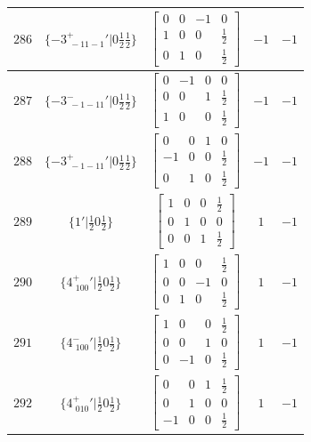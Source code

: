 \documentclass[fleqn,8pt]{jsarticle}
\begin{document}
\begin{longtable}{ccccc}
$ 286 $ & $ \{-3^{+}_{\,\,-11-1}{}'|0 \frac{1}{2} \frac{1}{2}\} $ & $ \begin{bmatrix} 0 & 0 & -1 & 0 \\ 1 & 0 & 0 & \frac{1}{2} \\ 0 & 1 & 0 & \frac{1}{2} \end{bmatrix} $ & $ -1 $ & $ -1 $ \\ \hline
$ 287 $ & $ \{-3^{-}_{\,\,-1-11}{}'|0 \frac{1}{2} \frac{1}{2}\} $ & $ \begin{bmatrix} 0 & -1 & 0 & 0 \\ 0 & 0 & 1 & \frac{1}{2} \\ 1 & 0 & 0 & \frac{1}{2} \end{bmatrix} $ & $ -1 $ & $ -1 $ \\ \hline
$ 288 $ & $ \{-3^{+}_{\,\,-1-11}{}'|0 \frac{1}{2} \frac{1}{2}\} $ & $ \begin{bmatrix} 0 & 0 & 1 & 0 \\ -1 & 0 & 0 & \frac{1}{2} \\ 0 & 1 & 0 & \frac{1}{2} \end{bmatrix} $ & $ -1 $ & $ -1 $ \\ \hline
$ 289 $ & $ \{1{}'|\frac{1}{2} 0 \frac{1}{2}\} $ & $ \begin{bmatrix} 1 & 0 & 0 & \frac{1}{2} \\ 0 & 1 & 0 & 0 \\ 0 & 0 & 1 & \frac{1}{2} \end{bmatrix} $ & $ 1 $ & $ -1 $ \\ \hline
$ 290 $ & $ \{4^{+}_{\,\,100}{}'|\frac{1}{2} 0 \frac{1}{2}\} $ & $ \begin{bmatrix} 1 & 0 & 0 & \frac{1}{2} \\ 0 & 0 & -1 & 0 \\ 0 & 1 & 0 & \frac{1}{2} \end{bmatrix} $ & $ 1 $ & $ -1 $ \\ \hline
$ 291 $ & $ \{4^{-}_{\,\,100}{}'|\frac{1}{2} 0 \frac{1}{2}\} $ & $ \begin{bmatrix} 1 & 0 & 0 & \frac{1}{2} \\ 0 & 0 & 1 & 0 \\ 0 & -1 & 0 & \frac{1}{2} \end{bmatrix} $ & $ 1 $ & $ -1 $ \\ \hline
$ 292 $ & $ \{4^{+}_{\,\,010}{}'|\frac{1}{2} 0 \frac{1}{2}\} $ & $ \begin{bmatrix} 0 & 0 & 1 & \frac{1}{2} \\ 0 & 1 & 0 & 0 \\ -1 & 0 & 0 & \frac{1}{2} \end{bmatrix} $ & $ 1 $ & $ -1 $ \\ \hline

\end{longtable}
\end{document}
